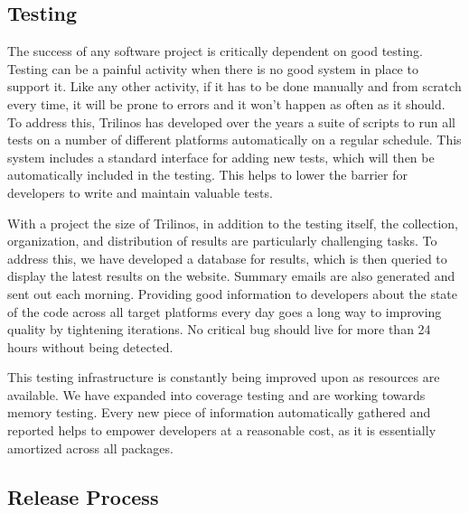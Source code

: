 \documentclass[12pt,relax]{article}
\begin{document}
\subsection{Testing}


The success of any software project is critically dependent on good testing.
Testing can be a painful activity when there is no good system in place to
support it.  Like any other activity, if it has to be done manually and from
scratch every time, it will be prone to errors and it won't happen as often as
it should.  To address this, Trilinos has developed over the years a suite of
scripts to run all tests on a number of different platforms automatically on a
regular schedule.  This system includes a standard interface for adding new
tests, which will then be automatically included in the testing.  This helps
to lower the barrier for developers to write and maintain valuable tests.

With a project the size of Trilinos, in addition to the testing itself, the
collection, organization, and distribution of results are particularly
challenging tasks.  To address this, we have developed a database for results,
which is then queried to display the latest results on the website.  Summary
emails are also generated and sent out each morning.  Providing good
information to developers about the state of the code across all target
platforms every day goes a long way to improving quality by tightening
iterations.  No critical bug should live for more than 24 hours without being 
detected.

This testing infrastructure is constantly being improved upon as resources are
available.  We have expanded into coverage testing and are working towards
memory testing.  Every new piece of information automatically gathered and
reported helps to empower developers at a reasonable cost, as it is essentially
amortized across all packages.

\subsection{Release Process}
\end{document}
